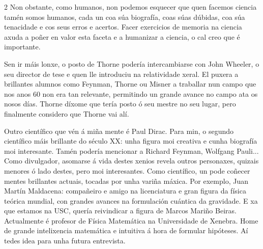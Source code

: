 \begin{multicols}{2}
Non obstante, como humanos, non podemos esquecer que quen facemos
ciencia tamén somos humanos, cada un coa súa biografía, coas súas dúbidas, coa
súa tenacidade e cos seus erros e acertos. Facer exercicios de memoria na
ciencia axuda a poñer en valor esta faceta e a humanizar a ciencia, o cal creo
que é importante.


Sen ir máis lonxe, o posto de Thorne podería intercambiarse con John
Wheeler, o seu director de tese e quen lle introduciu na relatividade xeral.
El puxera a brillantes alumnos como Feynman, Thorne ou Misner a traballar nun
campo que nos anos 60 non era tan relevante, permitindo un grande avance no
campo ata os nosos días. Thorne díxome que tería posto ó seu mestre no seu
lugar, pero finalmente considero que Thorne vai alí.

Outro científico que vén á miña mente é Paul Dirac. Para min, o
segundo científico máis brillante do século XX: unha figura moi creativa e
cunha biografía moi interesante. Tamén podería mencionar a Richard
Feynman, Wolfgang Pauli... Como divulgador, asomarse á vida destes xenios
revela outros personaxes, quizais menores ó lado destes, pero moi interesantes.
Como científico, un pode coñecer mentes brillantes actuais, tocadas por unha
variña máxica. Por exemplo, Juan Martín Maldacena: compañeiro e amigo
na licenciatura e gran figura da física teórica mundial, con grandes avances na
formulación cuántica da gravidade. E xa que estamos na USC, quería reivindicar
a figura de Marcos Mariño Beiras. Actualmente é profesor de Física
Matemática na Universidade de Xenebra. Home de grande intelixencia matemática e
intuitiva á hora de formular hipóteses. Aí tedes idea para unha futura
entrevista.



\end{multicols}
